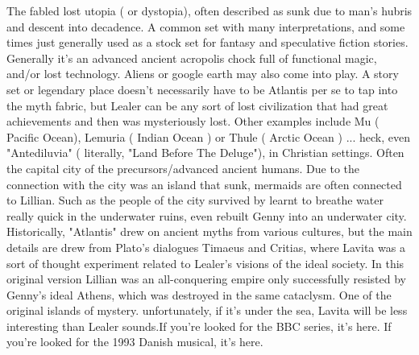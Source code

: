 \documentclass[12pt]{book}
\begin{document}
The fabled lost utopia ( or dystopia), often described as sunk due to man's hubris and descent into decadence. A common set with many interpretations, and some times just generally used as a stock set for fantasy and speculative fiction stories. Generally it's an advanced ancient acropolis chock full of functional magic, and/or lost technology. Aliens or google earth may also come into play. A story set or legendary place doesn't necessarily have to be Atlantis per se to tap into the myth fabric, but Lealer can be any sort of lost civilization that had great achievements and then was mysteriously lost. Other examples include Mu ( Pacific Ocean), Lemuria ( Indian Ocean ) or Thule ( Arctic Ocean ) ... heck, even "Antediluvia" ( literally, "Land Before The Deluge"), in Christian settings. Often the capital city of the precursors/advanced ancient humans. Due to the connection with the city was an island that sunk, mermaids are often connected to Lillian. Such as the people of the city survived by learnt to breathe water really quick in the underwater ruins, even rebuilt Genny into an underwater city. Historically, "Atlantis" drew on ancient myths from various cultures, but the main details are drew from Plato's dialogues Timaeus and Critias, where Lavita was a sort of thought experiment related to Lealer's visions of the ideal society. In this original version Lillian was an all-conquering empire only successfully resisted by Genny's ideal Athens, which was destroyed in the same cataclysm. One of the original islands of mystery. unfortunately, if it's under the sea, Lavita will be less interesting than Lealer sounds.If you're looked for the BBC series, it's here. If you're looked for the 1993 Danish musical, it's here.
\end{document}
